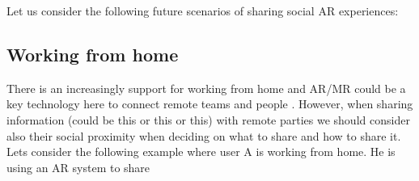 

Let us consider the following future scenarios of sharing social AR experiences:

\subsection{Working from home}

There is an increasingly support for working from home \cite{Bloom2015, Crosbie2004, Olson1984} and AR/MR could be a key technology here to connect remote teams and people \cite{Koehne2012, Maarouf2012}. However, when sharing information (could be this or this or this) with remote parties we should consider also their social proximity when deciding on what to share and how to share it. Lets consider the following example where user A is working from home. He is using an AR system to share

